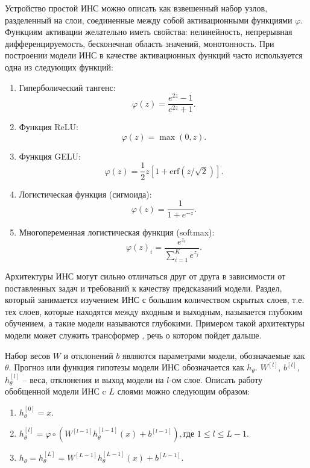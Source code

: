 Устройство простой ИНС можно описать как взвешенный набор узлов, разделенный на слои, соединенные между собой активационными функциями $\varphi$. Функциям активации желательно иметь свойства: нелинейность, непрерывная дифференцируемость, бесконечная область значений, монотонность. При построении модели ИНС в качестве активационных функций часто используется одна из следующих функций:
\begin{enumerate}
    \item Гиперболический тангенс:
          \begin{equation}
              \varphi(z) = \frac{e^{2z}-1}{e^{2z}+1}.
          \end{equation}
    \item Функция ReLU:
          \begin{equation}
              \varphi(z) = \max(0, z).
              \label{relu}
          \end{equation}
    \item Функция GELU:
          \begin{equation}
              \varphi(z) = \frac{1}{2}z\left[1+\text{erf}\left({z}/\sqrt{2}\right)\right].
              \label{gelu}
          \end{equation}
    \item Логистическая функция (сигмоида):
          \begin{equation}
              \varphi(z) = \frac{1}{1+e^{-z}}.
          \end{equation}
    \item Многопеременная логистическая функция (softmax):
          \begin{equation}
              \varphi(z)_i = \frac{e^{z_i}}{\sum_{i=1}^{K}e^{z_j}}.
          \end{equation}
\end{enumerate}

Архитектуры ИНС могут сильно отличаться друг от друга в зависимости от поставленных задач и требований к качеству предсказаний модели. Раздел, который занимается изучением ИНС с большим количеством скрытых слоев, т.е. тех слоев, которые находятся между входным и выходным, называется глубоким обучением, а такие модели называются глубокими. Примером такой архитектуры модели может служить  трансформер \cite{transformer-paper}, речь о котором пойдет дальше.

Набор весов $W$ и отклонений $b$ являются параметрами модели, обозначаемые как $\theta$. Прогноз или функция гипотезы модели ИНС обозначается как $h_{\theta}$. $W^{[l]}$, $b^{[l]}$, $h_{\theta}^{[l]}$ -- веса, отклонения и выход модели на $l$-ом слое. Описать работу обобщенной модели ИНС c $L$ слоями можно следующим образом:
\begin{enumerate}
    \item $h_{\theta}^{[0]} = x$.
    \item $h_{\theta}^{[l]} = \varphi \circ \left(W^{[l-1]}h_{\theta}^{[l-1]}(x) + b^{[l-1]}\right), \text{где } 1 \le l \le L-1$.
    \item $h_{\theta} = h_{\theta}^{[L]} = W^{[L-1]}h_{\theta}^{[L-1]}(x) + b^{[L-1]}$.
\end{enumerate}

